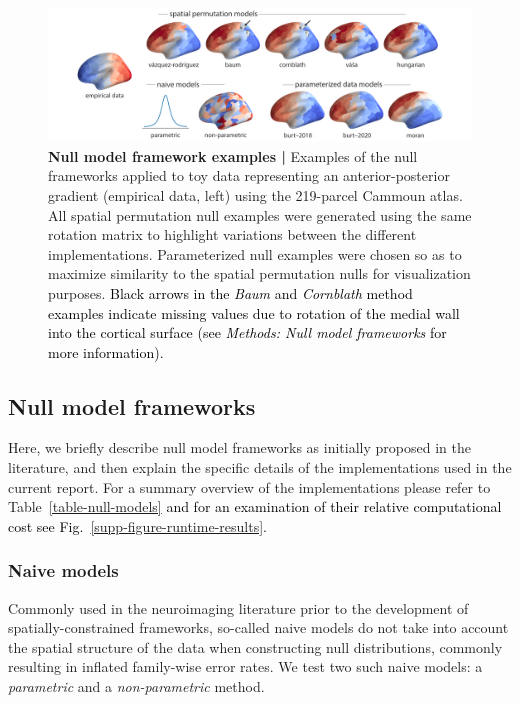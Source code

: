 \documentclass[12pt,aps,pra,reprint,showkeys]{revtex4-1}
\newcommand{\nimg}[1]{\textcolor{black}{{#1}}}
\begin{document}
\begin{figure}[htp]
  \begin{center}
    \centerline{\includegraphics[width=\textwidth]{null_frameworks.png}}
    \caption{
      \textbf{Null model framework examples |}
      Examples of the null frameworks applied to toy data representing an anterior-posterior gradient (empirical data, left) using the 219-parcel Cammoun atlas.
      All spatial permutation null examples were generated using the same rotation matrix to highlight variations between the different implementations.
      Parameterized null examples were chosen so as to maximize similarity to the spatial permutation nulls for visualization purposes.
      \nimg{Black arrows in the \textit{Baum} and \textit{Cornblath} method examples indicate missing values due to rotation of the medial wall into the cortical surface (see \textit{Methods: Null model frameworks} for more information).}
      }
    \label{figure-null-frameworks}
  \end{center}
\end{figure}

\subsection*{Null model frameworks}

Here, we briefly describe null model frameworks as initially proposed in the literature, and then explain the specific details of the implementations used in the current report.
For a summary overview of the implementations please refer to Table~\ref{table-null-models} \nimg{and for an examination of their relative computational cost see Fig.~\ref{supp-figure-runtime-results}.}

\subsubsection*{Naive models}

Commonly used in the neuroimaging literature prior to the development of spatially-constrained frameworks, so-called naive models do not take into account the spatial structure of the data when constructing null distributions, commonly resulting in inflated family-wise error rates.
We test two such naive models: a \emph{parametric} and a \emph{non-parametric} method.
\end{document}
